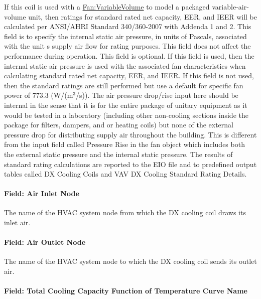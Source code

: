 If this coil is used with a \hyperref[fanvariablevolume]{Fan:VariableVolume} to model a packaged variable-air-volume unit, then ratings for standard rated net capacity, EER, and IEER will be calculated per ANSI/AHRI Standard 340/360-2007 with Addenda 1 and 2. This field is to specify the internal static air pressure, in units of Pascals, associated with the unit s supply air flow for rating purposes. This field does not affect the performance during operation. This field is optional. If this field is used, then the internal static air pressure is used with the associated fan characteristics when calculating standard rated net capacity, EER, and IEER. If this field is not used, then the standard ratings are still performed but use a default for specific fan power of 773.3 (W/(m\(^{3}\)/s)). The air pressure drop/rise input here should be internal in the sense that it is for the entire package of unitary equipment as it would be tested in a laboratory (including other non-cooling sections inside the package for filters, dampers, and or heating coils) but none of the external pressure drop for distributing supply air throughout the building. This is different from the input field called Pressure Rise in the fan object which includes both the external static pressure and the internal static pressure. The results of standard rating calculations are reported to the EIO file and to predefined output tables called DX Cooling Coils and VAV DX Cooling Standard Rating Details.

\paragraph{Field: Air Inlet Node}\label{field-air-inlet-node}

The name of the HVAC system node from which the DX cooling coil draws its inlet air.

\paragraph{Field: Air Outlet Node}\label{field-air-outlet-node}

The name of the HVAC system node to which the DX cooling coil sends its outlet air.

\paragraph{Field: Total Cooling Capacity Function of Temperature Curve Name}\label{field-total-cooling-capacity-function-of-temperature-curve-name-1}

